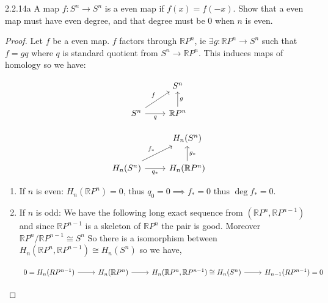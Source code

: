 \documentclass{article}
\newcommand{\R}{\mathbb{R}}
\newcommand{\RP}{\mathbb{R} P}
\begin{document}
\begin{PROB}{2.2.14a}\label{Problem 2.2.14a.}
    A map $f: S^n \to S^n$ is a even map if $f(x) = f(-x)$. Show that a even map must have even degree, and that degree must be 0 when $n$ is even.     
\end{PROB}
\begin{proof}
    Let $f$ be a even map. $f$ factors through $\RP^n$, ie $\exists g: \RP^n \to S^n$ such that $f = g q$ where $q$ is standard quotient from $S^n \to \RP^n$. This induces maps of homology so we have:
    
\[\begin{tikzcd}
	& {S^n} \\
	{S^n} & {\R P^n}
	\arrow["f", from=2-1, to=1-2]
	\arrow["q"', from=2-1, to=2-2]
	\arrow["g"', from=2-2, to=1-2]
\end{tikzcd}\]

\[\begin{tikzcd}
	& {H_n(S^n)} \\
	{H_n(S^n)} & {H_n(\R P^n)}
	\arrow["{f_*}", from=2-1, to=1-2]
	\arrow["{q_*}"', from=2-1, to=2-2]
	\arrow["{g_*}"', from=2-2, to=1-2]
\end{tikzcd}\]

\begin{enumerate}
    \item If $n$ is even: $H_n(\R P^n) = 0$, thus $q_0 =0 \implies f_* = 0$ thus $\deg f_* = 0$. 
    \item If $n$ is odd: We have the following long exact sequence from $(\R P^n, \R P^{n - 1})$  and since $\R P^{n - 1}$ is a skeleton of $\R P^n$ the pair is good. Moreover $\R P^n / \R P^{n - 1} \cong S^{n}$  So there is a isomorphism between $H_n(\R P^n, \R P^{n - 1}) \cong H_n(S^n)$ so we have, 
    
\[\begin{tikzcd}
	{0=H_n(R P^{n-1})} & {H_n(\R P^n)} & {H_n(\R P^n, \R P^{n - 1}) \cong H_n(S^n)} & {H_{n-1}(RP^{n-1}) = 0}
	\arrow[from=1-1, to=1-2]
	\arrow[from=1-2, to=1-3]
	\arrow[from=1-3, to=1-4]
\end{tikzcd}\]


\end{enumerate}
\end{proof}
\end{document}
